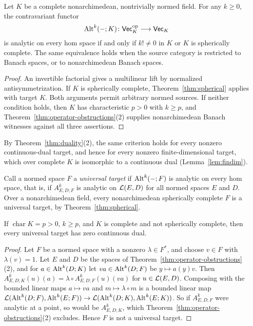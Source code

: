 \begin{theorem}\label{thm:scalar-classification}
Let $K$ be a complete nonarchimedean, nontrivially normed field. For any $k\ge0$, the contravariant functor
\[
 \operatorname{Alt}^k(-;K)\colon\mathsf{Vec}_K^{\mathrm{op}}\longrightarrow\mathsf{Vec}_K
\]
is analytic on every hom space if and only if $k!\ne0$ in $K$ or $K$ is spherically complete. The same equivalence holds when the source category is restricted to Banach spaces, or to nonarchimedean Banach spaces.
\end{theorem}

\begin{proof}
An invertible factorial gives a multilinear lift by normalized antisymmetrization. If $K$ is spherically complete, Theorem~\ref{thm:spherical} applies with target $K$. Both arguments permit arbitrary normed sources. If neither condition holds, then $K$ has characteristic $p>0$ with $k\ge p$, and Theorem~\ref{thm:operator-obstructions}(2) supplies nonarchimedean Banach witnesses against all three assertions.
\end{proof}

By Theorem~\ref{thm:duality}(2), the same criterion holds for every nonzero continuous-dual target, and hence for every
nonzero finite-dimensional target, which over complete $K$ is isomorphic to a continuous dual (Lemma~\ref{lem:findim}).

Call a normed space $F$ a \emph{universal target} if $\operatorname{Alt}^k(-;F)$ is analytic on every hom space, that is, if
$A^k_{E,D;F}$ is analytic on $\mathcal L(E,D)$ for all normed spaces $E$ and $D$. Over a nonarchimedean field, every
nonarchimedean spherically complete $F$ is a universal target, by Theorem~\ref{thm:spherical}.

\begin{proposition}\label{prop:universal-zero-dual}
If $\operatorname{char}K=p>0$, $k\ge p$, and $K$ is complete and not spherically complete, then every universal target
has zero continuous dual.
\end{proposition}

\begin{proof}
Let $F$ be a normed space with a nonzero $\lambda\in F^*$, and choose $v\in F$ with $\lambda(v)=1$. Let $E$ and $D$ be the
spaces of Theorem~\ref{thm:operator-obstructions}(2), and for $a\in\operatorname{Alt}^k(D;K)$ let $va\in\operatorname{Alt}^k(D;F)$ be $y\mapsto a(y)v$.
Then $A^k_{E,D;K}(u)(a)=\lambda\circ A^k_{E,D;F}(u)(va)$ for $u\in\mathcal L(E,D)$. Composing with the bounded linear maps
$a\mapsto va$ and $m\mapsto\lambda\circ m$ is a bounded linear map
$\mathcal L(\operatorname{Alt}^k(D;F),\operatorname{Alt}^k(E;F))\to\mathcal L(\operatorname{Alt}^k(D;K),\operatorname{Alt}^k(E;K))$. So if $A^k_{E,D;F}$ were analytic at a point, so would be
$A^k_{E,D;K}$, which Theorem~\ref{thm:operator-obstructions}(2) excludes. Hence $F$ is not a universal target.
\end{proof}

